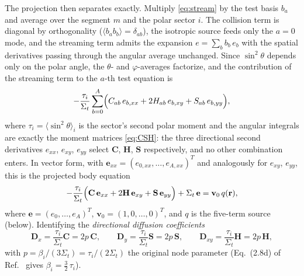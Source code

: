 \documentclass[11pt,a4paper]{article}
\begin{document}
The projection then separates exactly. Multiply
\eqref{eq:stream} by the test basis $b_a$ and average over the
segment $m$ and the polar sector $i$. The collision term is diagonal
by orthogonality ($\langle b_a b_b\rangle=\delta_{ab}$), the
isotropic source feeds only the $a{=}0$ mode, and the streaming term
admits the expansion $e=\sum_b b_b\,e_b$ with the spatial
derivatives passing through the angular average unchanged. Since
$\sin^2\theta$ depends only on the polar angle, the $\theta$- and
$\varphi$-averages factorize, and the contribution of the streaming
term to the $a$-th test equation is
\begin{equation}
-\frac{\tau_i}{\Sigma_t}\sum_{b=0}^{A}\Bigl(
C_{ab}\,e_{b,xx}+2H_{ab}\,e_{b,xy}+S_{ab}\,e_{b,yy}\Bigr),
\label{eq:proj}
\end{equation}
where $\tau_i=\langle\sin^2\theta\rangle_i$ is the sector's second
polar moment and the angular integrals are exactly the moment
matrices \eqref{eq:CSH}: the three directional second derivatives
$e_{xx}$, $e_{xy}$, $e_{yy}$ select $\mathbf{C}$, $\mathbf{H}$,
$\mathbf{S}$ respectively, and no other combination enters. In vector
form, with $\mathbf{e}_{xx}=(e_{0,xx},\ldots,e_{A,xx})^T$ and
analogously for $e_{xy}$, $e_{yy}$, this is the projected body
equation
\begin{equation}
-\frac{\tau_i}{\Sigma_t}\Bigl(\mathbf{C}\,\mathbf{e}_{xx}
+2\mathbf{H}\,\mathbf{e}_{xy}+\mathbf{S}\,\mathbf{e}_{yy}\Bigr)
+\Sigma_t\,\mathbf{e}=\mathbf{v}_0\,q(\mathbf{r}),
\label{eq:A7}
\end{equation}
where $\mathbf{e}=(e_0,\ldots,e_A)^T$, $\mathbf{v}_0=(1,0,\ldots,0)^T$,
and $q$ is the five-term source (below). Identifying the
\emph{directional diffusion coefficients}
\begin{equation}
\mathbf{D}_x = \frac{\tau_i}{\Sigma_t}\mathbf{C} = 2p\,\mathbf{C},
\qquad
\mathbf{D}_y = \frac{\tau_i}{\Sigma_t}\mathbf{S} = 2p\,\mathbf{S},
\qquad
\mathbf{D}_{xy} = \frac{\tau_i}{\Sigma_t}\mathbf{H} = 2p\,\mathbf{H},
\label{eq:A8}
\end{equation}
with $p=\beta_i/(3\Sigma_t)=\tau_i/(2\Sigma_t)$ the original node
parameter (Eq.~(2.8d) of Ref.~\cite{psn2027} gives
$\beta_i=\tfrac32\,\tau_i$).
\end{document}
